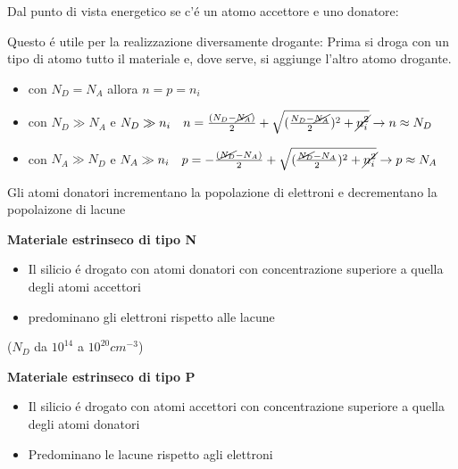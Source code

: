 \documentclass{article}
\begin{document}
Dal punto di vista energetico se c'\'e un atomo accettore e uno donatore:

Questo \'e utile per la realizzazione diversamente drogante:
Prima si droga con un tipo di atomo tutto il materiale e, dove serve, si aggiunge l'altro atomo drogante.

\begin{itemize}
    \item con $N_D = N_A$ allora $ n = p = n_i$
    \item con $N_D \gg N_A$ e $N_D \gg n_i  \quad n = \frac{(N_D - \cancel{N_A})}{2} + \sqrt{(\frac{N_D - \cancel{N_A}}{2})^2 + \cancel{n_i^2}} \rightarrow n \approx N_D$
    \item con $N_A \gg N_D$ e $N_A \gg n_i  \quad p = -\frac{(\cancel{N_D} - N_A)}{2} + \sqrt{(\frac{\cancel{N_D} - N_A}{2})^2 + \cancel{n_i^2}} \rightarrow p \approx N_A$
\end{itemize}

Gli atomi donatori incrementano la popolazione di elettroni e decrementano la popolaizone di lacune

\begin{minipage}[t]{0.45\textwidth}
    \textbf{Materiale estrinseco di tipo N}
    \begin{itemize}
        \item Il silicio \'e drogato con atomi donatori con concentrazione superiore a quella degli atomi accettori
        \item predominano gli elettroni rispetto alle lacune
    \end{itemize}
    ($N_D$ da $10^{14}$ a $10^{20} cm^{-3}$)

    \begin{center}
    \end{center}
\end{minipage}
\begin{minipage}[t]{0.5\textwidth}
    \textbf{Materiale estrinseco di tipo P}
    \begin{itemize}
        \item Il silicio \'e drogato con atomi accettori con concentrazione superiore a quella degli atomi donatori
        \item Predominano le lacune rispetto agli elettroni
    \end{itemize}
    \begin{center}
    \end{center}
\end{minipage}
\end{document}

